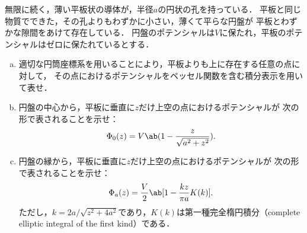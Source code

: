 \begin{bx1}
  無限に続く，薄い平板状の導体が，半径$a$の円状の孔を持っている．
  平板と同じ物質でできた，その孔よりもわずかに小さい，薄くて平らな円盤が
  平板とわずかな隙間をあけて存在している．
  円盤のポテンシャルは$V$に保たれ，平板のポテンシャルはゼロに保たれているとする．
  \begin{enumerate}[(a)]%
    \item
      適切な円筒座標系を用いることにより，平板よりも上に存在する任意の点に対して，
      その点におけるポテンシャルをベッセル関数を含む積分表示を用いて表せ．
    \item
      円盤の中心から，平板に垂直に$z$だけ上空の点におけるポテンシャルが
      次の形で表されることを示せ：
      \begin{gather}%
        \Phi_0(z) = V \ab(1- \frac{z}{\sqrt{a^2 + z^2}}).
      \end{gather}%
    \item 
      円盤の縁から，平板に垂直に$z$だけ上空の点におけるポテンシャルが
      次の形で表されることを示せ：
      \begin{gather}%
        \Phi_a(z) = \frac{V}{2}\ab[1 - \frac{kz}{\pi a}K(k)].
      \end{gather}%
      ただし，$k = 2a/\sqrt{z^2+4a^2}$であり，$K(k)$は第一種完全楕円積分（complete elliptic integral of the first kind）である．
  \end{enumerate}
\end{bx1}
\clearpage
